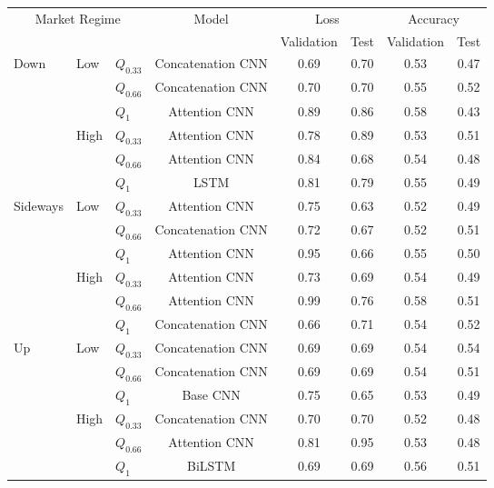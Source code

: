 \begin{tabular}{lll|c|cc|cc}
    \toprule
    \multicolumn{3}{c|}{\multirow{2}{*}{Market Regime}} & \multirow{2}{*}{Model} & \multicolumn{2}{c|}{Loss} & \multicolumn{2}{c}{Accuracy}  \\
    \multicolumn{3}{c|}{} & & Validation & Test & Validation & Test \\
    \midrule
    \multirow{6}{*}{Down}     & \multirow{3}{*}{Low}  & $Q_{0.33}$ & Concatenation CNN & 0.69 & 0.70         & 0.53       & 0.47             \\
    &                       & $Q_{0.66}$ & Concatenation CNN & 0.70 & 0.70 & 0.55 & 0.52 \\
    &                       & $Q_{1}$    & Attention CNN     & 0.89 & 0.86 & 0.58 & 0.43 \\
    & \multirow{3}{*}{High} & $Q_{0.33}$ & Attention CNN     & 0.78 & 0.89 & 0.53 & 0.51 \\
    &                       & $Q_{0.66}$ & Attention CNN     & 0.84 & 0.68 & 0.54 & 0.48 \\
    &                       & $Q_{1}$    & LSTM              & 0.81 & 0.79 & 0.55 & 0.49 \\
    \midrule
    \multirow{6}{*}{Sideways} & \multirow{3}{*}{Low}  & $Q_{0.33}$ & Attention CNN     & 0.75 & 0.63         & 0.52       & 0.49             \\
    &                       & $Q_{0.66}$ & Concatenation CNN & 0.72 & 0.67 & 0.52 & 0.51 \\
    &                       & $Q_{1}$    & Attention CNN     & 0.95 & 0.66 & 0.55 & 0.50 \\
    & \multirow{3}{*}{High} & $Q_{0.33}$ & Attention CNN     & 0.73 & 0.69 & 0.54 & 0.49 \\
    &                       & $Q_{0.66}$ & Attention CNN     & 0.99 & 0.76 & 0.58 & 0.51 \\
    &                       & $Q_{1}$    & Concatenation CNN & 0.66 & 0.71 & 0.54 & 0.52 \\
    \midrule
    \multirow{6}{*}{Up}       & \multirow{3}{*}{Low}  & $Q_{0.33}$ & Concatenation CNN & 0.69 & 0.69 & 0.54       & 0.54             \\
    &                       & $Q_{0.66}$ & Concatenation CNN & 0.69 & 0.69 & 0.54 & 0.51 \\
    &                       & $Q_{1}$    & Base CNN           & 0.75 & 0.65 & 0.53 & 0.49 \\
    & \multirow{3}{*}{High} & $Q_{0.33}$ & Concatenation CNN & 0.70 & 0.70 & 0.52 & 0.48 \\
    &                       & $Q_{0.66}$ & Attention CNN     & 0.81 & 0.95 & 0.53 & 0.48 \\
    &                       & $Q_{1}$    & BiLSTM            & 0.69 & 0.69 & 0.56 & 0.51 \\
    \bottomrule
\end{tabular}